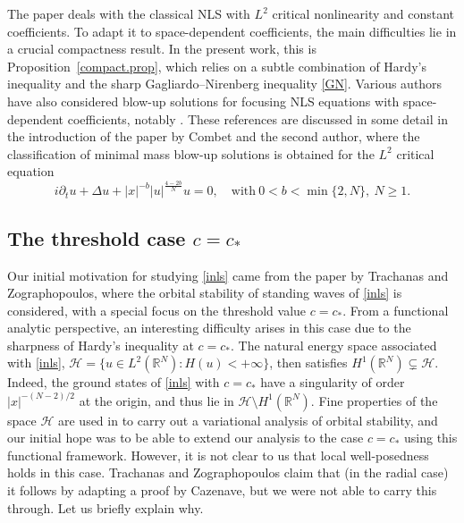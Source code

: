\documentclass[reqno]{amsart}
\newcommand{\real}{\mathbb{R}}
\newcommand{\rn}{\real^N}
\newcommand{\sm}{\setminus}
\let\ge= \geqslant
\theoremstyle{plain}
\theoremstyle{definition}
\numberwithin{equation}{section}
\begin{document}
The paper \cite{keraani} deals with the
classical NLS with $L^2$ critical nonlinearity and constant coefficients. To adapt it to
space-dependent coefficients, the main difficulties lie in a crucial compactness result.
In the present work, this is Proposition~\ref{compact.prop}, which
relies on a subtle combination of Hardy's inequality and the sharp Gagliardo--Nirenberg inequality
\eqref{GN}. 
Various authors have also considered blow-up solutions for focusing NLS equations 
with space-dependent coefficients, notably \cite{rs,bcd,m96}. 
These references are discussed in some detail in the introduction of the paper 
\cite{combet} by Combet and the second author, where the classification 
of minimal mass blow-up solutions is obtained for the $L^2$ critical equation
\[
i\partial_t u + \Delta u + |x|^{-b}|u|^{\frac{4-2b}{N}}u = 0, \quad 
\text{with} \ 0<b<\min\{2,N\}, \ N\ge1.
\]



\subsection{The threshold case $c=c_*$}\label{threshold.sec}

Our initial motivation for studying \eqref{inls} came from the paper
\cite{greeks} by Trachanas and Zographopoulos, 
where the orbital stability of standing waves of \eqref{inls} is considered, with 
a special focus on the threshold value $c=c_*$. From a functional analytic perspective, an
interesting difficulty arises in this case due to the sharpness of Hardy's inequality at $c=c_*$.
The natural energy space associated with \eqref{inls},
$\mathcal{H}=\{u\in L^2(\rn) : H(u)<+\infty\}$, then satisfies $H^1(\rn)\subsetneq\mathcal{H}$. Indeed,
the ground states of \eqref{inls} with $c=c_*$ have a singularity of order $|x|^{-(N-2)/2}$ at the origin,
and thus lie in $\mathcal{H}\sm H^1(\rn)$. Fine properties of the space $\mathcal{H}$ are used
in \cite{greeks} to carry out a variational analysis of orbital stability, and our initial hope was to
be able to extend our analysis to the case $c=c_*$ using this functional framework.
However, it is not clear to us that local well-posedness holds in this case. 
Trachanas and Zographopoulos \cite[Theorem~3.1]{greeks} 
claim that (in the radial case) it follows by adapting a proof by Cazenave,
but we were not able to carry this through. Let us briefly explain why. 
\end{document}
